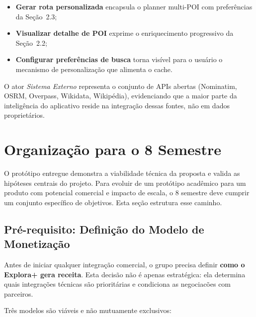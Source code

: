 \documentclass[12pt, a4paper]{article}
\begin{document}
\begin{itemize}
  \item \textbf{Gerar rota personalizada} encapsula o planner multi-POI com prefer\^encias da Se\c{c}\~ao~2.3;
  \item \textbf{Visualizar detalhe de POI} exprime o enriquecimento progressivo da Se\c{c}\~ao~2.2;
  \item \textbf{Configurar prefer\^encias de busca} torna vis\'ivel para o usu\'ario o mecanismo de personaliza\c{c}\~ao que alimenta o cache.
\end{itemize}

O ator \emph{Sistema Externo} representa o conjunto de APIs abertas (Nominatim, OSRM, Overpass, Wikidata, Wikip\'edia), evidenciando que a maior parte da intelig\^encia do aplicativo reside na integra\c{c}\~ao dessas fontes, n\~ao em dados propriet\'arios.

\section{Organiza\c{c}\~ao para o 8\textordmasculine{} Semestre}

O prot\'otipo entregue demonstra a viabilidade t\'ecnica da proposta e valida as hip\'oteses centrais do projeto. Para evoluir de um prot\'otipo acad\^emico para um produto com potencial comercial e impacto de escala, o 8\textordmasculine{} semestre deve cumprir um conjunto espec\'ifico de objetivos. Esta se\c{c}\~ao estrutura esse caminho.

\subsection{Pr\'e-requisito: Defini\c{c}\~ao do Modelo de Monetiza\c{c}\~ao}

Antes de iniciar qualquer integra\c{c}\~ao comercial, o grupo precisa definir \textbf{como o Explora+ gera receita}. Esta decis\~ao n\~ao \'e apenas estrat\'egica: ela determina quais integrações t\'ecnicas s\~ao prioritárias e condiciona as negociac\~oes com parceiros.

Tr\^es modelos s\~ao vi\'aveis e n\~ao mutuamente exclusivos:
\end{document}
